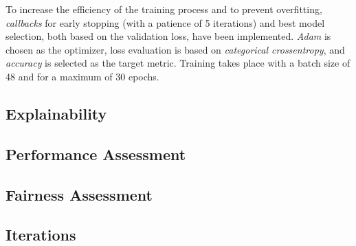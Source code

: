 To increase the efficiency of the training process and to prevent overfitting, \textit{callbacks} for early stopping (with a patience of 5 iterations) and best model selection, both based on the validation loss, have been implemented. 
\textit{Adam} is chosen as the optimizer, loss evaluation is based on \textit{categorical crossentropy}, and \textit{accuracy} is selected as the target metric. Training takes place with a batch size of 48 and for a maximum of 30 epochs. 


\subsection{Explainability}\label{subsec:Explainability}


\subsection{Performance Assessment}\label{subsec:Performance_Assessment}



\subsection{Fairness Assessment}\label{subsec:Fairness_Assessment}


\subsection{Iterations}\label{subsec:Iterations}

